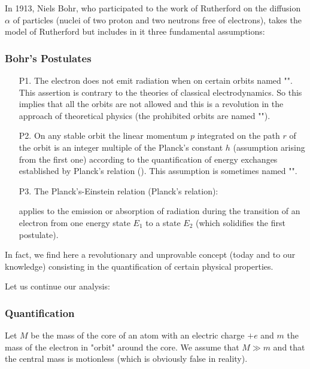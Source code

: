 In 1913, Niels Bohr, who participated to the work of Rutherford on the diffusion $\alpha$ of particles (nuclei of two proton and two neutrons free of electrons), takes the model of Rutherford but includes in it three fundamental assumptions:

\subsubsection{Bohr's Postulates}

	\begin{enumerate}
		\item[P1.] The electron does not emit radiation when on certain orbits named "". This assertion is contrary to the theories of classical electrodynamics. So this implies that all the orbits are not allowed and this is a revolution in the approach of theoretical physics (the prohibited orbits are named "").
		
		\item[P2.] On any stable orbit the linear momentum  $p$ integrated on the path $r$ of the orbit is an integer multiple of the Planck's constant $h$ (assumption arising from the first one) according to the quantification of energy exchanges established by Planck's relation (). This assumption is sometimes named "".
		
		\item[P3.] The Planck's-Einstein relation (Planck's relation):
			
applies to the emission or absorption of radiation during the transition of an electron from one energy state $E_1$ to a state $E_2$ (which solidifies the first postulate).		
	\end{enumerate}
In fact, we find here a revolutionary and unprovable concept (today and to our knowledge) consisting in the quantification of certain physical properties.

Let us continue our analysis:

\subsubsection{Quantification}

Let $M$ be the mass of the core of an atom with an electric charge $+e$ and $m$ the mass of the electron in "orbit" around the core. We assume that $M \gg m$ and that the central mass is motionless (which is obviously false in reality).

